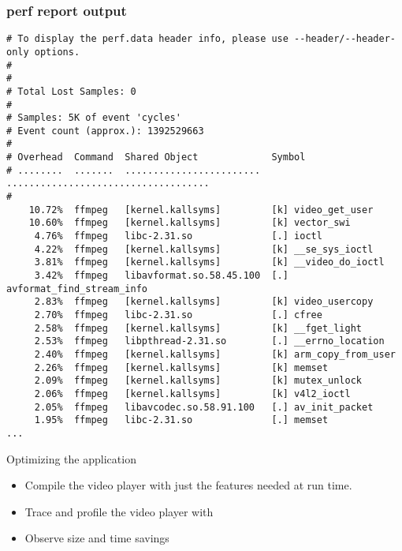 \begin{frame}[fragile]
\frametitle{perf report output}
\begin{block}{}
\tiny
\begin{verbatim}
# To display the perf.data header info, please use --header/--header-only options.
#
#
# Total Lost Samples: 0
#
# Samples: 5K of event 'cycles'
# Event count (approx.): 1392529663
#
# Overhead  Command  Shared Object             Symbol
# ........  .......  ........................  ....................................
#
    10.72%  ffmpeg   [kernel.kallsyms]         [k] video_get_user
    10.60%  ffmpeg   [kernel.kallsyms]         [k] vector_swi
     4.76%  ffmpeg   libc-2.31.so              [.] ioctl
     4.22%  ffmpeg   [kernel.kallsyms]         [k] __se_sys_ioctl
     3.81%  ffmpeg   [kernel.kallsyms]         [k] __video_do_ioctl
     3.42%  ffmpeg   libavformat.so.58.45.100  [.] avformat_find_stream_info
     2.83%  ffmpeg   [kernel.kallsyms]         [k] video_usercopy
     2.70%  ffmpeg   libc-2.31.so              [.] cfree
     2.58%  ffmpeg   [kernel.kallsyms]         [k] __fget_light
     2.53%  ffmpeg   libpthread-2.31.so        [.] __errno_location
     2.40%  ffmpeg   [kernel.kallsyms]         [k] arm_copy_from_user
     2.26%  ffmpeg   [kernel.kallsyms]         [k] memset
     2.09%  ffmpeg   [kernel.kallsyms]         [k] mutex_unlock
     2.06%  ffmpeg   [kernel.kallsyms]         [k] v4l2_ioctl
     2.05%  ffmpeg   libavcodec.so.58.91.100   [.] av_init_packet
     1.95%  ffmpeg   libc-2.31.so              [.] memset
...
\end{verbatim}
\end{block}
\end{frame}

\setuplabframe
{Optimizing the application}
{
\begin{itemize}
\item Compile the video player with just the features needed at run
      time.
\item Trace and profile the video player with 
\item Observe size and time savings
\end{itemize}
}

